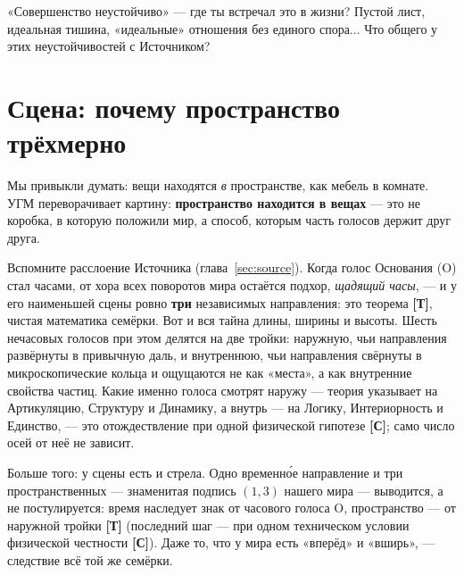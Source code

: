 \documentclass[11pt,letterpaper]{article}
\newcommand{\stT}{\textbf{[Т]}\xspace}
\newcommand{\stC}{\textbf{[С]}\xspace}
\begin{document}
\begin{askbox}
«Совершенство неустойчиво» --- где ты встречал это в жизни? Пустой
лист, идеальная тишина, «идеальные» отношения без единого спора...
Что общего у этих неустойчивостей с Источником?
\end{askbox}

\section{Сцена: почему пространство трёхмерно}
\label{sec:space}

Мы привыкли думать: вещи находятся \emph{в} пространстве, как мебель в
комнате. УГМ переворачивает картину: \textbf{пространство находится в
вещах} --- это не коробка, в которую положили мир, а способ, которым
часть голосов держит друг друга.

Вспомните расслоение Источника (глава~\ref{sec:source}). Когда голос
Основания (O) стал часами, от хора всех поворотов мира остаётся
подхор, \emph{щадящий часы}, --- и у его наименьшей сцены ровно
\textbf{три} независимых направления: это теорема \stT, чистая
математика семёрки. Вот и вся тайна длины, ширины и высоты. Шесть
нечасовых голосов при этом делятся на две тройки: наружную, чьи
направления развёрнуты в привычную даль, и внутреннюю, чьи
направления свёрнуты в микроскопические кольца и ощущаются не как
«места», а как внутренние свойства частиц. Какие именно голоса
смотрят наружу --- теория указывает на Артикуляцию, Структуру и
Динамику, а внутрь --- на Логику, Интериорность и Единство, --- это
отождествление при одной физической гипотезе \stC; само число осей
от неё не зависит.

Больше того: у сцены есть и стрела. Одно временно́е направление и три
пространственных --- знаменитая подпись $(1{,}3)$ нашего мира ---
выводится, а не постулируется: время наследует знак от часового
голоса O, пространство --- от наружной тройки \stT{} (последний шаг ---
при одном техническом условии физической честности \stC). Даже то,
что у мира есть «вперёд» и «вширь», --- следствие всё той же семёрки.
\end{document}
